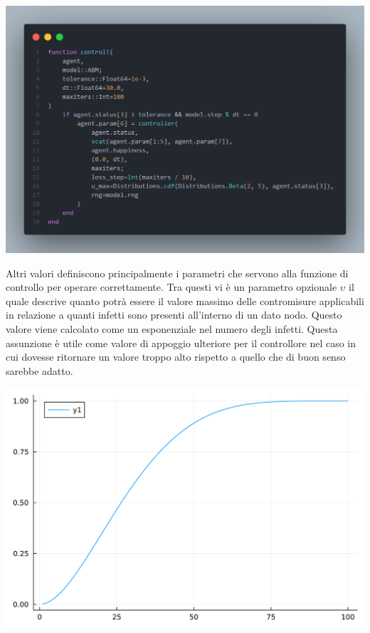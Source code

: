 \begin{minipage}{\linewidth}
	\centering
	\includegraphics[width=\textwidth]{img/controller_neuralode.png}
	\label{fig:controller_abm}
\end{minipage}

Altri valori definiscono principalmente i parametri che servono alla funzione di controllo per operare correttamente.
Tra questi vi è un parametro opzionale $\upsilon$ il quale descrive quanto potrà essere il valore massimo delle 
contromisure applicabili in relazione a quanti infetti sono presenti all'interno di un dato nodo. Questo valore viene 
calcolato come un esponenziale nel numero degli infetti. Questa assunzione è utile come valore di appoggio ulteriore 
per il controllore nel caso in cui dovesse ritornare un valore troppo alto rispetto a quello che di buon senso sarebbe 
adatto. 

\begin{minipage}{\linewidth}
	\centering
	\includegraphics[width=\textwidth]{img/beta_cdf.pdf}
	\label{fig:max_countermeasures_function_abm}
\end{minipage}

